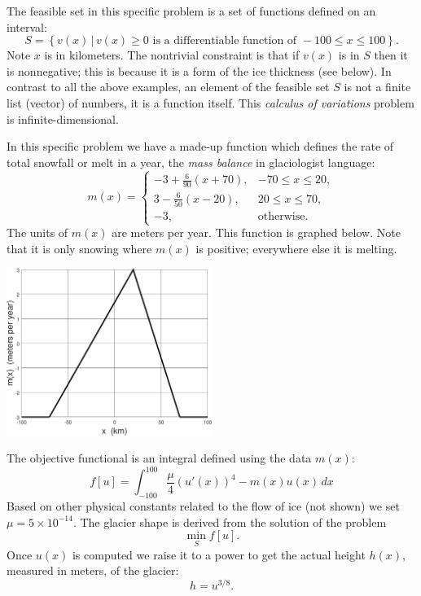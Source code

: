 \documentclass[11pt]{amsart}
\begin{document}
\begin{enumerate}
The feasible set in this specific problem is a set of functions defined on an interval:
    $$S = \left\{v(x) \,\big|\, v(x) \ge 0 \text{ is a differentiable function of } -100 \le x \le 100\right\}.$$
Note $x$ is in kilometers.  The nontrivial constraint is that if $v(x)$ is in $S$ then it is nonnegative; this is because it is a form of the ice thickness (see below).  In contrast to all the above examples, an element of the feasible set $S$ is not a finite list (vector) of numbers, it is a function itself.  This \emph{calculus of variations} problem is infinite-dimensional.

In this specific problem we have a made-up function which defines the rate of total snowfall or melt in a year, the \emph{mass balance} in glaciologist language:
    $$m(x) = \begin{cases} -3 + \frac{6}{90} (x+70), & -70 \le x \le 20, \\
                            3 - \frac{6}{50} (x-20), & 20 \le x \le 70, \\
                           -3, & \text{otherwise}.
             \end{cases}$$
The units of $m(x)$ are meters per year.  This function is graphed below.  Note that it is only snowing where $m(x)$ is positive; everywhere else it is melting.

\bigskip
\begin{center}
\includegraphics[width=0.5\textwidth]{massbalance}  %
\end{center}


The objective functional is an integral defined using the data $m(x)$:
    $$f[u] = \int_{-100}^{100} \frac{\mu}{4} \left(u'(x)\right)^4 - m(x) u(x)\,dx$$
Based on other physical constants related to the flow of ice (not shown) we set $\mu = 5 \times 10^{-14}$.  The glacier shape is derived from the solution of the problem
    $$\min_S f[u].$$
Once $u(x)$ is computed we raise it to a power to get the actual height $h(x)$, measured in meters, of the glacier:
    $$h = u^{3/8}.$$  %


\end{enumerate}
\end{document}
